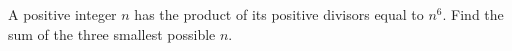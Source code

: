 A positive integer $n$ has the product of its positive divisors equal to $n^6$. Find the sum of the three smallest possible $n$.
